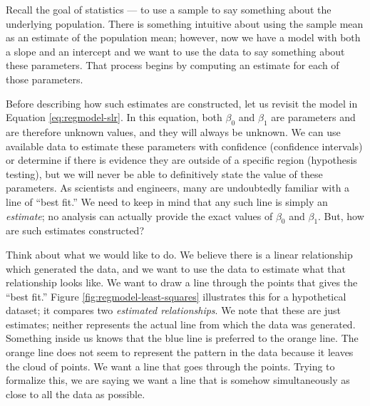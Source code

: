 \documentclass[
]{book}
\theoremstyle{plain}
\theoremstyle{mydefn}
\theoremstyle{myexmpl}
\theoremstyle{remark}
\begin{document}
Recall the goal of statistics --- to use a sample to say something about the underlying population. There is something intuitive about using the sample mean as an estimate of the population mean; however, now we have a model with both a slope and an intercept and we want to use the data to say something about these parameters. That process begins by computing an estimate for each of those parameters.

Before describing how such estimates are constructed, let us revisit the model in Equation \eqref{eq:regmodel-slr}. In this equation, both \(\beta_0\) and \(\beta_1\) are parameters and are therefore unknown values, and they will always be unknown. We can use available data to estimate these parameters with confidence (confidence intervals) or determine if there is evidence they are outside of a specific region (hypothesis testing), but we will never be able to definitively state the value of these parameters. As scientists and engineers, many are undoubtedly familiar with a line of ``best fit.'' We need to keep in mind that any such line is simply an \emph{estimate}; no analysis can actually provide the exact values of \(\beta_0\) and \(\beta_1\). But, how are such estimates constructed?

Think about what we would like to do. We believe there is a linear relationship which generated the data, and we want to use the data to estimate what that relationship looks like. We want to draw a line through the points that gives the ``best fit.'' Figure \ref{fig:regmodel-least-squares} illustrates this for a hypothetical dataset; it compares two \emph{estimated relationships}. We note that these are just estimates; neither represents the actual line from which the data was generated. Something inside us knows that the blue line is preferred to the orange line. The orange line does not seem to represent the pattern in the data because it leaves the cloud of points. We want a line that goes through the points. Trying to formalize this, we are saying we want a line that is somehow simultaneously as close to all the data as possible.
\end{document}
